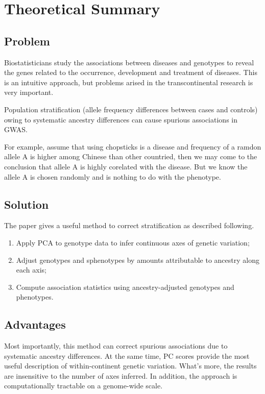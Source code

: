 \section{Theoretical Summary}

\subsection{Problem}
Biostatisticians study the associations between diseases and genotypes to reveal the genes related to the occurrence, development and treatment of diseases. 
This is an intuitive approach, but problems arised in the transcontinental research is very important.

Population stratification (allele frequency differences between cases and controls) owing to systematic ancestry differences can cause spurious associations in GWAS. 

For example, assume that using chopsticks is a disease and frequency of a ramdon allele A is higher among Chinese than other countried, then we may come to the conclusion that allele A is highly corelated with the disease. But we know the allele A is chosen randomly and is nothing to do with the phenotype. 

\subsection{Solution}
The paper gives a useful method to correct stratification as described following. 

\begin{enumerate}
    \item Apply PCA to genotype data to infer continuous axes of  genetic variation;
    \item Adjust genotypes and sphenotypes by amounts attributable to ancestry along each axis;
    \item Compute association statistics using ancestry-adjusted genotypes and phenotypes.
\end{enumerate}

\subsection{Advantages}

Most importantly, this method can correct spurious associations due to systematic ancestry differences.
At the same time, PC scores provide the most useful description of within-continent genetic variation. 
What's more, the results are insensitive to the number of axes inferred. 
In addition, the approach is computationally tractable on a genome-wide scale.

